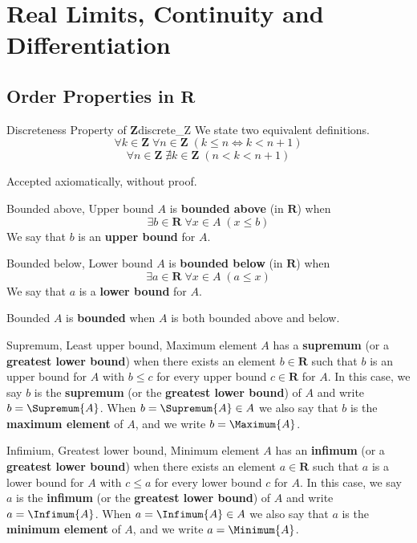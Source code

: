 \chapter{Real Limits, Continuity and Differentiation}
\section{Order Properties in \texorpdfstring{$ \mathbf{R} $}{R}}
\begin{Theorem}{Discreteness Property of $ \mathbf{Z} $}{discrete_Z}
    We state two equivalent definitions.
    \[ \forall k\in\mathbf{Z}\;\forall n\in\mathbf{Z}\;(k\le n \iff k<n+1) \]
    \[ \forall n\in\mathbf{Z}\;\nexists k\in\mathbf{Z}\;(n<k<n+1) \]
\end{Theorem}
\begin{Proof}{}{}
    Accepted axiomatically, without proof.
\end{Proof}
\begin{Definition}{Bounded above, Upper bound}{}
    $ A $ is \textbf{bounded above} (in $ \mathbf{R} $)
    when
    \[ \exists b\in\mathbf{R}\;\forall x\in A\;(x\leq b) \]
    We say that $ b $ is an \textbf{upper bound} for $ A $.
\end{Definition}
\begin{Definition}{Bounded below, Lower bound}{}
    $ A $ is \textbf{bounded below} (in $ \mathbf{R} $) when
    \[ \exists a\in\mathbf{R}\;\forall x\in A\;(a\le x) \]
    We say that $ a $ is a \textbf{lower bound} for $ A $.
\end{Definition}
\begin{Definition}{Bounded}{}
    $ A $ is \textbf{bounded} when $ A $ is both bounded
    above and below.
\end{Definition}
\begin{Definition}{Supremum, Least upper bound, Maximum element}{}
    $ A $ has a \textbf{supremum} (or a \textbf{greatest lower bound})
    when there exists an element $ b\in \mathbf{R} $ such that
    $ b $ is an upper bound for $ A $ with $ b\le c $ for
    every upper bound $ c\in\mathbf{R} $ for $ A $. In this case,
    we say $ b $ is the \textbf{supremum} (or the \textbf{greatest lower bound})
    of $ A $ and write $ b=\Supremum{A} $. When $ b=\Supremum{A}\in A $
    we also say that $ b $ is the \textbf{maximum element} of $ A $,
    and we write $ b=\Maximum{A} $.
\end{Definition}
\begin{Definition}{Infimium, Greatest lower bound, Minimum element}{}
    $ A $ has an \textbf{infimum} (or a \textbf{greatest lower bound})
    when there exists an element $ a\in \mathbf{R} $ such that
    $ a $ is a lower bound for $ A $ with $ c\le a $ for
    every lower bound $ c $ for $ A $. In this case,
    we say $ a $ is the \textbf{infimum} (or the \textbf{greatest lower bound})
    of $ A $ and write $ a=\Infimum{A} $. When $ a=\Infimum{A}\in A $
    we also say that $ a $ is the \textbf{minimum element} of $ A $,
    and we write $ a=\Minimum{A} $.
\end{Definition}
